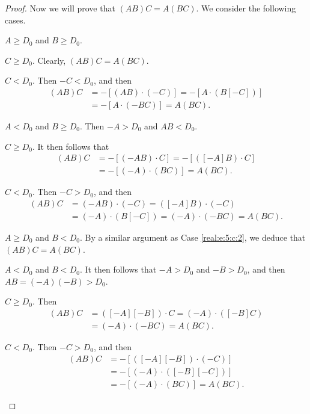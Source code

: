 \begin{proof}
	Now we will prove that $(A B) C = A (B C)$. We consider the following cases.
	\begin{bycases}
		\item $A \geq D_0$ and $B \geq D_0$.
		      \begin{bycases}
			      \item $C \geq D_0$. Clearly, $(A B) C = A (B C)$.
			      \item $C < D_0$. Then $-C < D_0$, and then
			            \begin{align*}
				            (A B) C & = -[(A B) \cdot (-C)] = -[A \cdot (B [-C])] \\
				                    & = -[A \cdot (-B C)] = A (B C).
			            \end{align*}
		      \end{bycases}
		\item \label{real:e:5:c:2} $A < D_0$ and $B \geq D_0$. Then $-A > D_0$ and $A B < D_0$.
		      \begin{bycases}
			      \item $C \geq D_0$. It then follows that
			            \begin{align*}
				            (A B) C & = -[(-A B) \cdot  C] = -[([-A] B) \cdot C] \\
				                    & = -[(-A) \cdot (B C)] = A (B C).
			            \end{align*}
			      \item $C < D_0$. Then $-C > D_0$, and then
			            \begin{align*}
				            (A B) C & = (-A B) \cdot (-C) = ([-A] B) \cdot (-C)             \\
				                    & = (-A) \cdot (B [-C]) = (-A) \cdot (- B C) = A (B C).
			            \end{align*}
		      \end{bycases}
		\item $A \geq D_0$ and $B < D_0$. By a similar argument as Case \ref{real:e:5:c:2}, we deduce that $(A B) C = A (B C)$.
		\item $A < D_0$ and $B < D_0$. It then follows that $-A > D_0$ and $-B > D_0$, and then ${A B = (-A)(-B) > D_0}$.
		      \begin{bycases}
			      \item $C \geq D_0$. Then
			            \begin{align*}
				            (A B) C & = ([-A] [-B]) \cdot C = (-A) \cdot ([-B] C) \\
				                    & = (-A) \cdot (-B C) = A (B C).
			            \end{align*}
			      \item $C < D_0$. Then $-C > D_0$, and then
			            \begin{align*}
				            (A B) C & = -[([-A] [-B]) \cdot (-C)]      \\
				                    & = -[(-A) \cdot ([-B] [-C])]      \\
				                    & = -[(-A) \cdot (B C)] = A (B C).
			            \end{align*}
		      \end{bycases}
	\end{bycases}


\end{proof}

